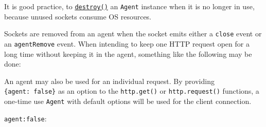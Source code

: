 It is good practice, to \hyperref[agentdestroy]{\texttt{destroy()}} an
\texttt{Agent} instance when it is no longer in use, because unused
sockets consume OS resources.

Sockets are removed from an agent when the socket emits either a
\texttt{\textquotesingle{}close\textquotesingle{}} event or an
\texttt{\textquotesingle{}agentRemove\textquotesingle{}} event. When
intending to keep one HTTP request open for a long time without keeping
it in the agent, something like the following may be done:

\begin{Shaded}
\begin{Highlighting}[]
\OperatorTok{,}\KeywordTok{=\textgreater{}}\NormalTok{ \{}
\NormalTok{\})}\NormalTok{(}\OperatorTok{,}\KeywordTok{=\textgreater{}}\NormalTok{ \{}
\NormalTok{(}\NormalTok{)}\OperatorTok{;}
\NormalTok{\})}\OperatorTok{;}
\end{Highlighting}
\end{Shaded}

An agent may also be used for an individual request. By providing
\texttt{\{agent:\ false\}} as an option to the \texttt{http.get()} or
\texttt{http.request()} functions, a one-time use \texttt{Agent} with
default options will be used for the client connection.

\texttt{agent:false}:

\begin{Shaded}
\begin{Highlighting}[]
\NormalTok{(\{}
  \OperatorTok{:} \OperatorTok{,}
  \OperatorTok{:} \OperatorTok{,}
  \OperatorTok{:} \StringTok{\textquotesingle{}/\textquotesingle{}}\OperatorTok{,}
  \OperatorTok{:} \OperatorTok{,}  
\NormalTok{\}}\OperatorTok{,}\KeywordTok{=\textgreater{}}\NormalTok{ \{}
\NormalTok{\})}\OperatorTok{;}
\end{Highlighting}
\end{Shaded}

